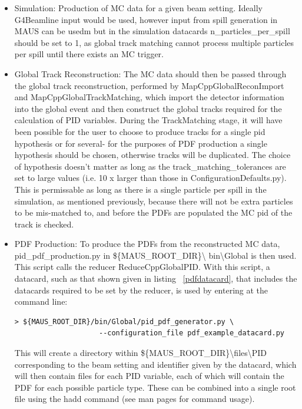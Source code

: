 \begin{itemize}
\item Simulation: Production of MC data for a given beam setting. Ideally G4Beamline input would be used, however input from spill generation in MAUS can be usedm but in the simulation datacards n\_particles\_per\_spill should be set to 1, as global track matching cannot process multiple particles per spill until there exists an MC trigger.
\item Global Track Reconstruction: The MC data should then be passed through 
the global track reconstruction, performed by MapCppGlobalReconImport and MapCppGlobalTrackMatching, which import the detector 
information into the global event and then construct the global tracks required 
for the calculation of PID variables. During the TrackMatching stage, it will have been possible for the user to choose to produce tracks for a single pid hypothesis or for several- for the purposes of PDF production a single hypothesis should be chosen, otherwise tracks will be duplicated. The choice of hypothesis doesn't matter as long as the track\_matching\_tolerances are set to large values (i.e. 10 x larger than those in ConfigurationDefaults.py). This is permissable as long as there is a single particle per spill in the simulation, as mentioned previously, because there will not be extra particles to be mis-matched to, and before the PDFs are populated the MC pid of the track is checked.
\item PDF Production: To produce the PDFs from the reconstructed MC 
data, pid\_pdf\_production.py in \$\{MAUS\_ROOT\_DIR\}\textbackslash 
bin\textbackslash Global is then used. This script calls the reducer 
ReduceCppGlobalPID. With this script, a datacard, such as that shown 
given in listing ~\ref{pdfdatacard}, that includes the datacards required to be set by the reducer, is used by entering at the command line:
\begin{verbatim}
> ${MAUS_ROOT_DIR}/bin/Global/pid_pdf_generator.py \
                    --configuration_file pdf_example_datacard.py
\end{verbatim}
This will create a directory within \$\{MAUS\_ROOT\_DIR\}\textbackslash files\textbackslash PID corresponding to the beam setting and identifier given by the datacard, which will then contain files for each PID variable, each of which will contain the PDF for each possible particle type. These can be combined into a single root file using the hadd command (see man pages for command usage).
\end{itemize}

